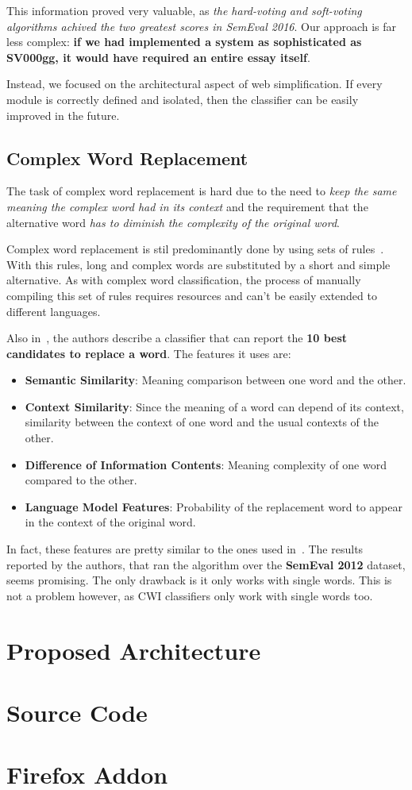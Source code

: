 \documentclass[11pt,a4paper]{article}
\begin{document}
This information proved very valuable, as \emph{the hard-voting and soft-voting algorithms achived the two greatest scores in SemEval 2016}. Our approach is far less complex: \textbf{if we had implemented a system as sophisticated as SV000gg, it would have required an entire essay itself}.

Instead, we focused on the architectural aspect of web simplification. If every module is correctly defined and isolated, then the classifier can be easily improved in the future.

\subsection{Complex Word Replacement}

The task of complex word replacement is hard due to the need to \emph{keep the same meaning the complex word had in its context} and the requirement that the alternative word \emph{has to diminish the complexity of the original word}.

Complex word replacement is stil predominantly done by using sets of rules~\cite{glavavs2015simplifying}. With this rules, long and complex words are substituted by a short and simple alternative. As with complex word classification, the process of manually compiling this set of rules requires resources and can't be easily extended to different languages.

Also in~\cite{glavavs2015simplifying}, the authors describe a classifier that can report the \textbf{10 best candidates to replace a word}. The features it uses are:

\begin{itemize}
	\item{\textbf{Semantic Similarity}: Meaning comparison between one word and the other.}
	\item{\textbf{Context Similarity}: Since the meaning of a word can depend of its context, similarity between the context of one word and the usual contexts of the other.}
	\item{\textbf{Difference of Information Contents}: Meaning complexity of one word compared to the other.}
	\item{\textbf{Language Model Features}: Probability of the replacement word to appear in the context of the original word.}
\end{itemize}

In fact, these features are pretty similar to the ones used in~\cite{paetzold2016sv000gg}. The results reported by the authors, that ran the algorithm over the \textbf{SemEval 2012} dataset, seems promising. The only drawback is it only works with single words. This is not a problem however, as CWI classifiers only work with single words too.

\section{Proposed Architecture}






\appendix

\section{Source Code}

\section{Firefox Addon}
\end{document}
